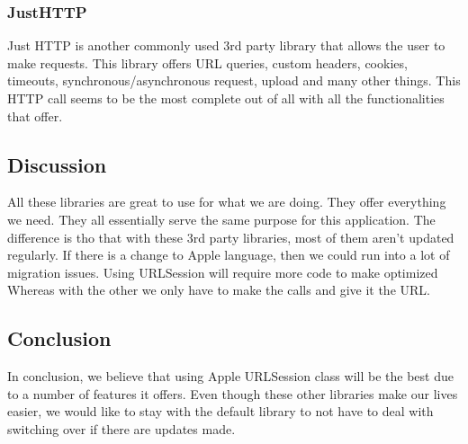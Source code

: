 \documentclass[onecolumn, draftclsnofoot,10pt, compsoc]{IEEEtran}
\begin{document}
\subsubsection{JustHTTP\cite{JustHTTP}}
\par Just HTTP is another commonly used 3rd party library that allows the user to make requests. This library offers URL queries, custom headers, cookies, timeouts, synchronous/asynchronous request, upload and many other things. This HTTP call seems to be the most complete out of all with all the functionalities that offer. 

\subsection{Discussion}
All these libraries are great to use for what we are doing. They offer everything we need. They all essentially serve the same purpose for this application. The difference is tho that with these 3rd party libraries, most of them aren't updated regularly. If there is a change to Apple language, then we could run into a lot of migration issues. Using URLSession will require more code to make optimized Whereas with the other we only have to make the calls and give it the URL.

\subsection{Conclusion}
In conclusion, we believe that using Apple URLSession class will be the best due to a number of features it offers. Even though these other libraries make our lives easier, we would like to stay with the default library to not have to deal with switching over if there are updates made. 



\end{document}
